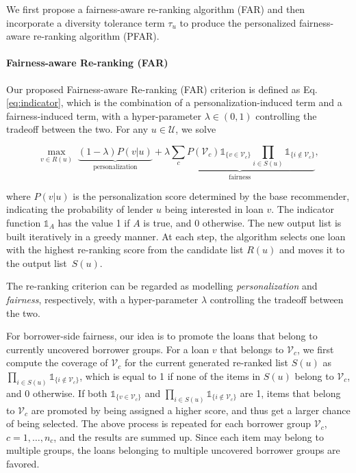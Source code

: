 We first propose a fairness-aware re-ranking algorithm (FAR) and then incorporate a diversity tolerance term $\tau_u$ to produce the personalized fairness-aware re-ranking algorithm (PFAR).


\paragraph{\textbf{Fairness-aware Re-ranking (FAR)}}
Our proposed Fairness-aware Re-ranking (FAR) criterion is defined as Eq.\eqref{eq:indicator}, which is the combination of a personalization-induced term and a fairness-induced term, with a hyper-parameter $\lambda\in(0,1)$ controlling the tradeoff between the two. For any $u\in \mathcal U$, we solve

\begin{equation}
\max_{v\in R(u)}\;\underbrace{(1-\lambda)P(v|u)}_{\text{personalization}} + \underbrace{\lambda\sum_{c}P(\mathcal V_c)\mathds{1}_{\{v\in \mathcal V_c\}}\prod_{i\in S(u)}\mathds{1}_{\{i\notin \mathcal V_c\}}}_{\text{fairness}},%
\label{eq:indicator}
\end{equation}

where $P(v|u)$ is the personalization score determined by the base recommender, indicating the probability of lender $u$ being interested in loan $v$. The indicator function $\mathds{1}_{A}$ has the value 1 if $A$ is true, and 0 otherwise. The new output list is built iteratively in a greedy manner. At each step, the algorithm selects one loan with the highest re-ranking score from the candidate list $R(u)$ and moves it to the output list~$S(u)$.

The re-ranking criterion can be regarded as modelling \textit{personalization} and \textit{fairness}, respectively, with a hyper-parameter $\lambda$ controlling the tradeoff between the two.

For borrower-side fairness, our idea is to promote the loans that belong to currently uncovered borrower groups. For a loan $v$ that belongs to $\mathcal V_c$, we first compute the coverage of $\mathcal V_c$ for the current generated re-ranked list $S(u)$ as $\prod_{i\in S(u)}\mathds{1}_{\{i\notin \mathcal V_c\}}$, which is equal to 1 if none of the items in $S(u)$ belong to $\mathcal V_c$, and 0 otherwise. If both $\mathds{1}_{\{v\in \mathcal V_c\}}$ and $\prod_{i\in S(u)}\mathds{1}_{\{i\notin \mathcal V_c\}}$ are 1, items that belong to $\mathcal V_c$ are promoted by being assigned a higher score, and thus get a larger chance of being selected. The above process is repeated for each borrower group $\mathcal V_c$, $c={1,\ldots,n_c}$, and the results are summed up. Since each item may belong to multiple groups, the loans belonging to multiple uncovered borrower groups are favored. 

